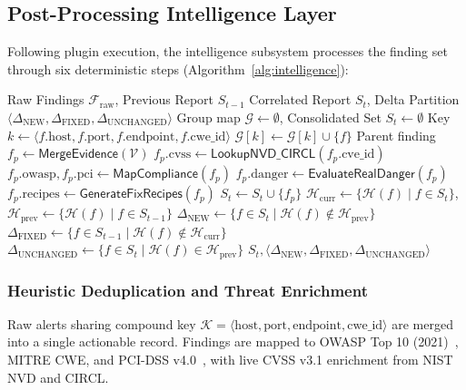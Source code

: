 \documentclass[conference]{IEEEtran}
\begin{document}
\subsection{Post-Processing Intelligence Layer}
Following plugin execution, the intelligence subsystem processes the finding set through six deterministic steps (Algorithm~\ref{alg:intelligence}):

\begin{algorithm}[t]
\small
\caption{Intelligence Correlation and Delta Auditing}
\label{alg:intelligence}
\begin{algorithmic}[1]
\REQUIRE Raw Findings $\mathcal{F}_{\text{raw}}$, Previous Report $S_{t-1}$
\ENSURE Correlated Report $S_t$, Delta Partition $\langle \Delta_{\text{NEW}}, \Delta_{\text{FIXED}}, \Delta_{\text{UNCHANGED}} \rangle$
\STATE Group map $\mathcal{G} \leftarrow \emptyset$, Consolidated Set $S_t \leftarrow \emptyset$
    \STATE Key $k \leftarrow \langle f.\text{host}, f.\text{port}, f.\text{endpoint}, f.\text{cwe\_id} \rangle$
    \STATE $\mathcal{G}[k] \leftarrow \mathcal{G}[k] \cup \{f\}$
\ENDFOR
{}
    \STATE Parent finding $f_p \leftarrow \textsf{MergeEvidence}(\mathcal{V})$
        \STATE $f_p.\text{cvss} \leftarrow \textsf{LookupNVD\_CIRCL}(f_p.\text{cve\_id})$
    \ENDIF
    \STATE $f_p.\text{owasp}, f_p.\text{pci} \leftarrow \textsf{MapCompliance}(f_p)$
    \STATE $f_p.\text{danger} \leftarrow \textsf{EvaluateRealDanger}(f_p)$
    \STATE $f_p.\text{recipes} \leftarrow \textsf{GenerateFixRecipes}(f_p)$
    \STATE $S_t \leftarrow S_t \cup \{f_p\}$
\ENDFOR
{}
    \STATE $\mathcal{H}_{\text{curr}} \leftarrow \{\mathcal{H}(f) \mid f \in S_t\}$, $\mathcal{H}_{\text{prev}} \leftarrow \{\mathcal{H}(f) \mid f \in S_{t-1}\}$
    \STATE $\Delta_{\text{NEW}} \leftarrow \{f \in S_t \mid \mathcal{H}(f) \notin \mathcal{H}_{\text{prev}}\}$
    \STATE $\Delta_{\text{FIXED}} \leftarrow \{f \in S_{t-1} \mid \mathcal{H}(f) \notin \mathcal{H}_{\text{curr}}\}$
    \STATE $\Delta_{\text{UNCHANGED}} \leftarrow \{f \in S_t \mid \mathcal{H}(f) \in \mathcal{H}_{\text{prev}}\}$
\ENDIF
\RETURN $S_t, \langle \Delta_{\text{NEW}}, \Delta_{\text{FIXED}}, \Delta_{\text{UNCHANGED}} \rangle$
\end{algorithmic}
\end{algorithm}

\subsubsection{Heuristic Deduplication and Threat Enrichment}
Raw alerts sharing compound key $\mathcal{K} = \langle \text{host}, \text{port}, \text{endpoint}, \text{cwe\_id} \rangle$ are merged into a single actionable record. Findings are mapped to OWASP Top 10 (2021)~\cite{owasp_top10}, MITRE CWE, and PCI-DSS v4.0~\cite{pci_dss}, with live CVSS v3.1 enrichment from NIST NVD and CIRCL.
\end{document}
